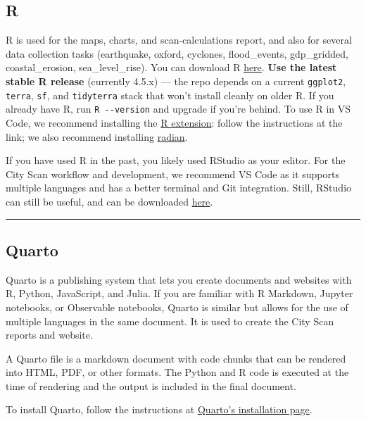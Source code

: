 \documentclass[
  letterpaper,
  DIV=11,
  numbers=noendperiod]{scrreprt}
\begin{document}
\subsection{R}\label{r}

R is used for the maps, charts, and scan-calculations report, and also
for several data collection tasks (earthquake, oxford, cyclones,
flood\_events, gdp\_gridded, coastal\_erosion, sea\_level\_rise). You
can download R \href{https://cran.r-project.org/}{here}. \textbf{Use the
latest stable R release} (currently 4.5.x) --- the repo depends on a
current \texttt{ggplot2}, \texttt{terra}, \texttt{sf}, and
\texttt{tidyterra} stack that won't install cleanly on older R. If you
already have R, run \texttt{R\ -\/-version} and upgrade if you're
behind. To use R in VS Code, we recommend installing the
\href{https://marketplace.visualstudio.com/items?itemName=REditorSupport.r}{R
extension}: follow the instructions at the link; we also recommend
installing \href{https://github.com/randy3k/radian}{radian}.

If you have used R in the past, you likely used RStudio as your editor.
For the City Scan workflow and development, we recommend VS Code as it
supports multiple languages and has a better terminal and Git
integration. Still, RStudio can still be useful, and can be downloaded
\href{https://posit.co/download/rstudio-desktop/}{here}.

\begin{center}\rule{0.5\linewidth}{0.5pt}\end{center}

\subsection{Quarto}\label{quarto}

Quarto is a publishing system that lets you create documents and
websites with R, Python, JavaScript, and Julia. If you are familiar with
R Markdown, Jupyter notebooks, or Observable notebooks, Quarto is
similar but allows for the use of multiple languages in the same
document. It is used to create the City Scan reports and website.

A Quarto file is a markdown document with code chunks that can be
rendered into HTML, PDF, or other formats. The Python and R code is
executed at the time of rendering and the output is included in the
final document.

To install Quarto, follow the instructions at
\href{https://quarto.org/docs/get-started/}{Quarto's installation page}.
\end{document}

